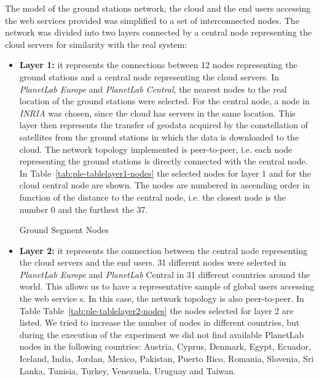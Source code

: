 The model of the ground stations network, the cloud and the end users accessing
the web services provided was simplified to a set of interconnected nodes. The
network was divided into two layers connected by a central node representing the
cloud servers for similarity with the real system: 
\begin{itemize}

\item \textbf{Layer 1:} it represents the connections between 12 nodes
  representing the ground stations and a central node representing the cloud
  servers. In \emph{PlanetLab Europe} and \emph{PlanetLab Central}, the nearest nodes to the
  real location of the ground stations were selected. For the central node, a
  node in \emph{INRIA} was chosen, since the \bonfire cloud has servers in the same
  location. This layer then represents the transfer of geodata acquired by the
  constellation of satellites from the ground stations in which the data is
  downloaded to the cloud. The network topology implemented is peer-to-peer,
  i.e. each node representing the ground stations is directly connected with the
  central node. In Table~\ref{tab:ple-tablelayer1-nodes} the \pl selected nodes for layer 1 and for the
  cloud central node are shown. The nodes are numbered in ascending order in
  function of the distance to the central node, i.e. the closest node is the
  number 0 and the furthest the 37. 

\begin{table}[hp]
  \centering
  {\small
  
  }
  \caption{Ground Segment Nodes}
  \label{tab:ple-tablelayer1-nodes}
\end{table}


\item \textbf{Layer 2:} it represents the connection between the central node
  representing the cloud servers and the end users. 31 different nodes were
  selected in \emph{PlanetLab Europe} and \emph{PlanetLab} Central in 31 different countries
  around the world. This allows us to have a representative sample of global
  users accessing the web service
s. In this case, the network topology is also peer-to-peer. In Table Table~\ref{tab:ple-tablelayer2-nodes} the nodes selected for layer 2 are listed. We tried to increase the number of nodes in different countries, but during the execution of the experiment we did not find available PlanetLab nodes in the following countries: Austria, Cyprus, Denmark, Egypt, Ecuador, Iceland, India, Jordan, Mexico, Pakistan, Puerto Rico, Romania, Slovenia, Sri Lanka, Tunisia, Turkey, Venezuela, Uruguay and Taiwan. 
\end{itemize}


